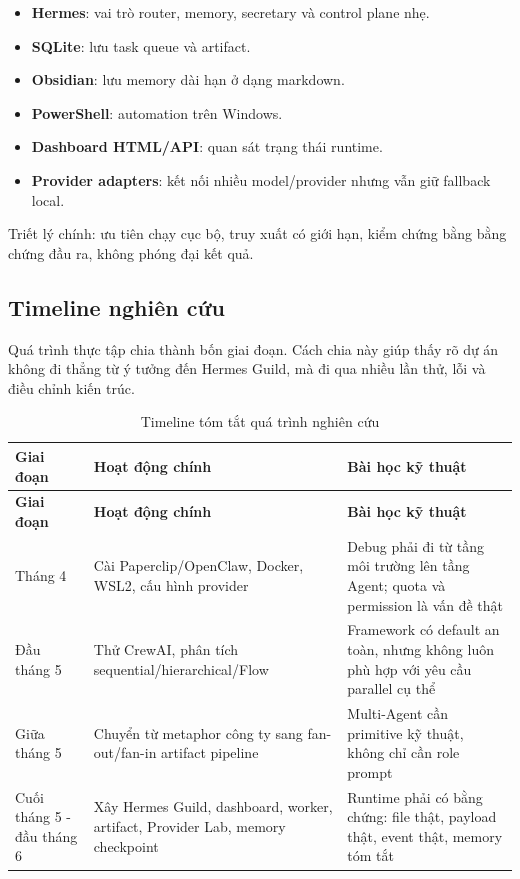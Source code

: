 \documentclass[12pt,a4paper]{article}
\begin{document}
\begin{itemize}
    \item \textbf{Hermes}: vai trò router, memory, secretary và control plane nhẹ.
    \item \textbf{SQLite}: lưu task queue và artifact.
    \item \textbf{Obsidian}: lưu memory dài hạn ở dạng markdown.
    \item \textbf{PowerShell}: automation trên Windows.
    \item \textbf{Dashboard HTML/API}: quan sát trạng thái runtime.
    \item \textbf{Provider adapters}: kết nối nhiều model/provider nhưng vẫn giữ fallback local.
\end{itemize}

Triết lý chính: ưu tiên chạy cục bộ, truy xuất có giới hạn, kiểm chứng bằng bằng chứng đầu ra, không phóng đại kết quả.

\subsection{Timeline nghiên cứu}

Quá trình thực tập chia thành bốn giai đoạn. Cách chia này giúp thấy rõ dự án không đi thẳng từ ý tưởng đến Hermes Guild, mà đi qua nhiều lần thử, lỗi và điều chỉnh kiến trúc.

\begin{longtable}{p{}p{}p{}}
\caption{Timeline tóm tắt quá trình nghiên cứu}\\
\toprule
\textbf{Giai đoạn} & \textbf{Hoạt động chính} & \textbf{Bài học kỹ thuật} \\
\midrule
\endfirsthead
\toprule
\textbf{Giai đoạn} & \textbf{Hoạt động chính} & \textbf{Bài học kỹ thuật} \\
\midrule
\endhead
Tháng 4 & Cài Paperclip/OpenClaw, Docker, WSL2, cấu hình provider & Debug phải đi từ tầng môi trường lên tầng Agent; quota và permission là vấn đề thật \\
Đầu tháng 5 & Thử CrewAI, phân tích sequential/hierarchical/Flow & Framework có default an toàn, nhưng không luôn phù hợp với yêu cầu parallel cụ thể \\
Giữa tháng 5 & Chuyển từ metaphor công ty sang fan-out/fan-in artifact pipeline & Multi-Agent cần primitive kỹ thuật, không chỉ cần role prompt \\
Cuối tháng 5 - đầu tháng 6 & Xây Hermes Guild, dashboard, worker, artifact, Provider Lab, memory checkpoint & Runtime phải có bằng chứng: file thật, payload thật, event thật, memory tóm tắt \\
\bottomrule
\end{longtable}
\end{document}
